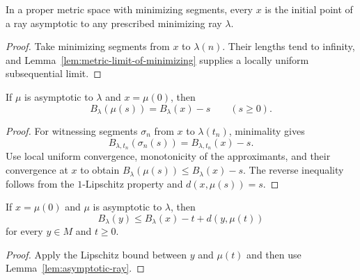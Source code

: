 \begin{lemma}
\label{lem:asymptotic-ray-exists}






In a proper metric space with minimizing segments, every $x$ is the
initial point of a ray asymptotic to any prescribed minimizing ray
$\lambda$.
\end{lemma}
\begin{proof}
\sketch

Take minimizing segments from $x$ to $\lambda(n)$. Their lengths tend
to infinity, and Lemma~\ref{lem:metric-limit-of-minimizing} supplies a
locally uniform subsequential limit.
\end{proof}

\begin{lemma}
\label{lem:asymptotic-ray}





If $\mu$ is asymptotic to $\lambda$ and $x=\mu(0)$, then
$$B_\lambda(\mu(s))=B_\lambda(x)-s\qquad(s\ge0).$$
\end{lemma}
\begin{proof}
\sketch

For witnessing segments $\sigma_n$ from $x$ to $\lambda(t_n)$,
minimality gives
$$B_{\lambda,t_n}(\sigma_n(s))=B_{\lambda,t_n}(x)-s.$$
Use local uniform convergence, monotonicity of the approximants, and
their convergence at $x$ to obtain
$B_\lambda(\mu(s))\le B_\lambda(x)-s$. The reverse inequality follows
from the $1$-Lipschitz property and $d(x,\mu(s))=s$.
\end{proof}

\begin{corollary}
\label{cor:asymptotic-ray-busemann-bound}





If $x=\mu(0)$ and $\mu$ is asymptotic to $\lambda$, then
$$B_\lambda(y)\le B_\lambda(x)-t+d(y,\mu(t))$$
for every $y\in M$ and $t\ge0$.
\end{corollary}
\begin{proof}
\sketch

Apply the Lipschitz bound between $y$ and $\mu(t)$ and then use
Lemma~\ref{lem:asymptotic-ray}.
\end{proof}


